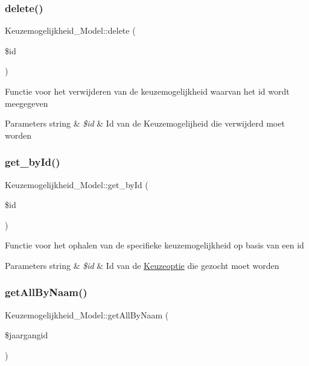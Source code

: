 \subsubsection{\texorpdfstring{delete()}{delete()}}
{\footnotesize\ttfamily Keuzemogelijkheid\+\_\+\+Model\+::delete (\begin{DoxyParamCaption}\item[{}]{\$id }\end{DoxyParamCaption})}

Functie voor het verwijderen van de keuzemogelijkheid waarvan het id wordt meegegeven 
\begin{DoxyParams}[1]{Parameters}
string & {\em \$id} & Id van de Keuzemogelijheid die verwijderd moet worden \\
\hline
\end{DoxyParams}
\mbox{\label{class_keuzemogelijkheid___model_a88c8b0a6b02a7da7c5d1d573a66c11c7}} 
\subsubsection{\texorpdfstring{get\+\_\+by\+Id()}{get\_byId()}}
{\footnotesize\ttfamily Keuzemogelijkheid\+\_\+\+Model\+::get\+\_\+by\+Id (\begin{DoxyParamCaption}\item[{}]{\$id }\end{DoxyParamCaption})}

Functie voor het ophalen van de specifieke keuzemogelijkheid op basis van een id 
\begin{DoxyParams}[1]{Parameters}
string & {\em \$id} & Id van de \mbox{\hyperlink{class_keuzeoptie}{Keuzeoptie}} die gezocht moet worden \\
\hline
\end{DoxyParams}
\mbox{\label{class_keuzemogelijkheid___model_a4bd9ea550274de1237a3692a7b20c6d0}} 
\subsubsection{\texorpdfstring{get\+All\+By\+Naam()}{getAllByNaam()}}
{\footnotesize\ttfamily Keuzemogelijkheid\+\_\+\+Model\+::get\+All\+By\+Naam (\begin{DoxyParamCaption}\item[{}]{\$jaargangid }\end{DoxyParamCaption})}

